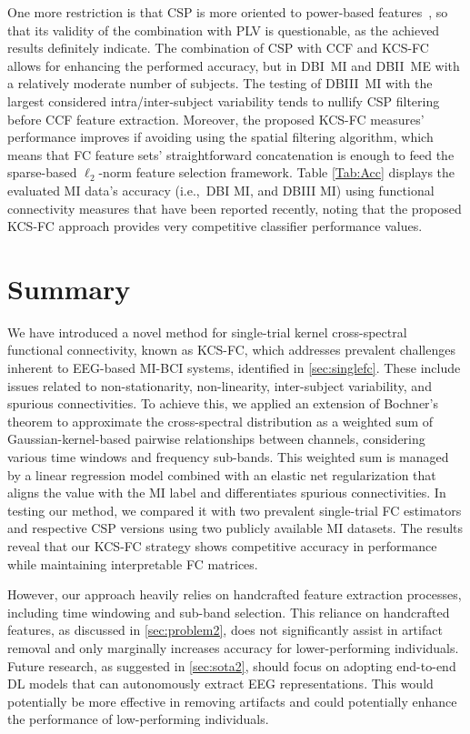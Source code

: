 One more restriction is that CSP is more oriented to power-based features~\cite{kumar2018eeg}, so that its validity of the combination with PLV is questionable, as the achieved results definitely indicate. The combination of CSP with CCF and KCS-FC allows for enhancing the performed accuracy, but in DBI~MI and DBII~ME with a relatively moderate number of subjects. The testing of DBIII~MI with the largest considered intra/inter-subject variability tends to nullify CSP filtering before CCF feature extraction. Moreover, the proposed KCS-FC measures' performance improves if avoiding using the spatial filtering algorithm, which means that FC feature sets' straightforward concatenation is enough to feed the sparse-based $\ell_2$-norm feature selection framework. Table \ref{Tab:Acc} displays the evaluated MI data's accuracy (i.e.,~DBI MI, and DBIII MI) using functional connectivity measures that have been reported recently, noting that the proposed KCS-FC approach provides very competitive classifier performance values.



\section{Summary}

We have introduced a novel method for single-trial kernel cross-spectral functional connectivity, known as KCS-FC, which addresses prevalent challenges inherent to EEG-based MI-BCI systems, identified in \cref{sec:singlefc}. These include issues related to non-stationarity, non-linearity, inter-subject variability, and spurious connectivities. To achieve this, we applied an extension of Bochner's theorem to approximate the cross-spectral distribution as a weighted sum of Gaussian-kernel-based pairwise relationships between channels, considering various time windows and frequency sub-bands. This weighted sum is managed by a linear regression model combined with an elastic net regularization that aligns the value with the MI label and differentiates spurious connectivities. In testing our method, we compared it with two prevalent single-trial FC estimators and respective CSP versions using two publicly available MI datasets. The results reveal that our KCS-FC strategy shows competitive accuracy in performance while maintaining interpretable FC matrices.

However, our approach heavily relies on handcrafted feature extraction processes, including time windowing and sub-band selection. This reliance on handcrafted features, as discussed in \cref{sec:problem2}, does not significantly assist in artifact removal and only marginally increases accuracy for lower-performing individuals. Future research, as suggested in \cref{sec:sota2}, should focus on adopting end-to-end DL models that can autonomously extract EEG representations. This would potentially be more effective in removing artifacts and could potentially enhance the performance of low-performing individuals.
